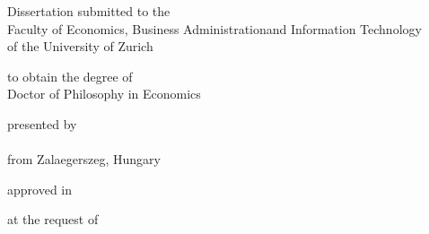 \makeatletter
    \let\inserttitle\@title
    \let\insertauthor\@author
    \let\insertdate\@date
    \let\insertchairman\@chairman
    \let\insertcommittee\@committee
\makeatother

\begin{titlepage}
    \begin{doublespace}
    \begin{center}
        \vspace*{3cm}

        \begin{LARGE}
            \textbf{\inserttitle}
        \end{LARGE}

        \vfill

        \begin{large}
            Dissertation submitted to the\\Faculty of Economics, Business Administrationand Information Technology\\of the University of Zurich
        \end{large}
 
        \vfill

        \begin{large}
            to obtain the degree of\\
            Doctor of Philosophy in Economics
        \end{large}

        \vfill

        \begin{large}
            presented by\\
            \textbf{\insertauthor}\\
            from Zalaegerszeg, Hungary
        \end{large}

        \vfill

        \begin{large}
            approved in \monthyeardate\insertdate
        \end{large}

        \vfill

        \begin{large}
            at the request of\\\insertcommittee
        \end{large}

    \vspace*{1cm}

    \end{center}
    \end{doublespace}
\end{titlepage}
